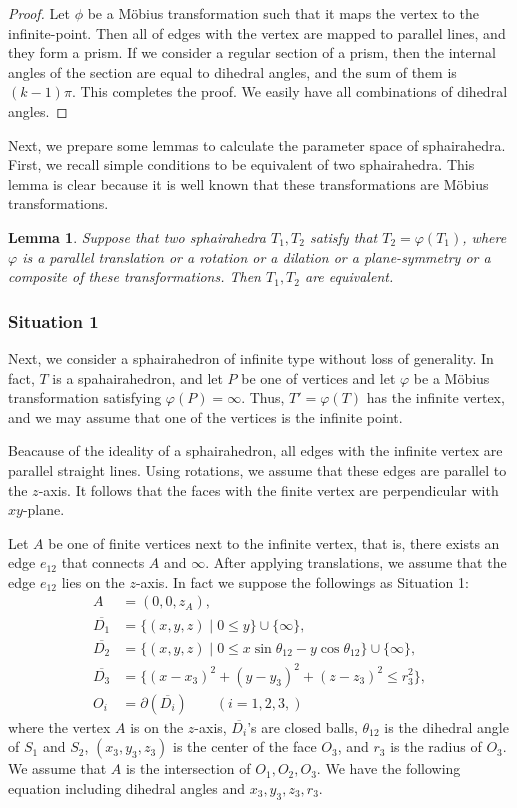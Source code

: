 \documentclass[suppldata, dvipdfmx]{interact}
\theoremstyle{plain}%
\newtheorem{lemma}[theorem]{Lemma}
\theoremstyle{definition}
\theoremstyle{remark}
\theoremstyle{problemstyle}
\begin{document}
\begin{proof}
 Let $\phi$ be a M\"obius transformation such that it maps the vertex to
 the infinite-point. Then all of edges with the vertex are mapped to
 parallel lines, and they form a prism. If we consider a
 regular section of a prism, then the internal angles of the section 
 are equal to dihedral angles, and the sum of them is $(k-1)\pi$.  This
 completes the proof.  We easily have all combinations of dihedral angles.
\end{proof}

Next, we prepare some lemmas to calculate the parameter space of sphairahedra. First, we recall simple conditions to be equivalent of two sphairahedra.  This lemma is clear because it is well known that these transformations are M\"obius transformations. 

\begin{lemma} \label{lemma:equivalentOfSH}
Suppose that two sphairahedra $T_1, T_2$ satisfy that $T_2=\varphi(T_1)$, where $\varphi$ is a parallel translation or a rotation or a dilation or a plane-symmetry or a composite of these transformations.  Then $T_1, T_2$ are equivalent. 
\end{lemma}

\subsubsection{Situation 1}
Next, we consider a sphairahedron of infinite type without loss of generality.  In fact, $T$ is a spahairahedron, and  let $P$ be one of vertices and let $\varphi$ be a M\"obius transformation satisfying $\varphi(P)=\infty$.  Thus, $T'=\varphi(T)$ has the infinite vertex, and we may assume that one of the vertices is the infinite point.

Beacause of the ideality of a sphairahedron, all edges with the infinite vertex are parallel straight lines.  Using rotations, we assume that these edges are parallel to the $z$-axis.  It follows that the faces with the finite vertex are perpendicular with $xy$-plane.

Let $A$ be one of finite vertices next to the infinite vertex, that is, there exists an edge $e_{12}$ that connects $A$ and $\infty$.  After applying translations, we assume that the edge $e_{12}$ lies on the $z$-axis.  In fact we suppose the followings as Situation 1:
\begin{align*}
A &= (0,0,z_A),\\ 
\overline{D_1}  &= \{ (x,y,z) \mid 0 \le y \} \cup \{\infty\} ,\\
\overline{D_2}  &= \{ (x,y,z) \mid 0 \le x\sin\theta_{12} - y\cos\theta_{12} \}\cup \{\infty\} ,\\
\overline{D_3}  &= \{ (x-x_3)^2+(y-y_3)^2+(z-z_3)^2 \le r_3^2 \}, \\
O_i & = \partial(\overline{D_i}) \qquad(i=1,2,3,)
\end{align*}
where the vertex $A$ is on the $z$-axis, $\overline{D_i}$'s are closed balls, $\theta_{12}$ is the dihedral angle of $S_1$ and $S_2$,  $(x_3, y_3, z_3)$ is the center of the face $O_3$, and $r_3$ is the radius of $O_3$.  We assume that $A$ is the intersection of $O_1, O_2, O_3$.  We have the following equation including dihedral angles and  $x_3, y_3, z_3, r_3$.
\end{document}
